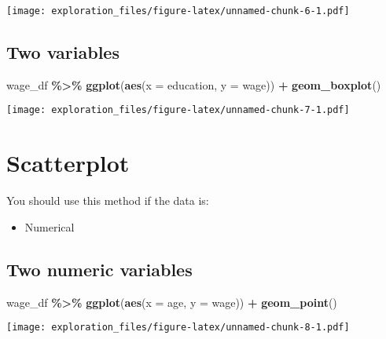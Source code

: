 \documentclass[
]{book}
\newenvironment{Shaded}{\begin{snugshade}}{\end{snugshade}}
\newcommand{\DataTypeTok}[1]{\textcolor[rgb]{0.13,0.29,0.53}{#1}}
\newcommand{\KeywordTok}[1]{\textcolor[rgb]{0.13,0.29,0.53}{\textbf{#1}}}
\newcommand{\NormalTok}[1]{#1}
\newcommand{\OperatorTok}[1]{\textcolor[rgb]{0.81,0.36,0.00}{\textbf{#1}}}
\newcommand{\StringTok}[1]{\textcolor[rgb]{0.31,0.60,0.02}{#1}}
\providecommand{\tightlist}{%
  \setlength{\itemsep}{0pt}\setlength{\parskip}{0pt}}
\begin{document}
\texttt{[image: exploration\_files/figure-latex/unnamed-chunk-6-1.pdf]}

\hypertarget{two-variables-3}{%
\section{Two variables}\label{two-variables-3}}

\begin{Shaded}
\begin{Highlighting}[]
\NormalTok{wage\_df }\OperatorTok{\%\textgreater{}\%}\StringTok{ }
\StringTok{  }\KeywordTok{ggplot}\NormalTok{(}\KeywordTok{aes}\NormalTok{(}\DataTypeTok{x =}\NormalTok{ education, }\DataTypeTok{y =}\NormalTok{ wage)) }\OperatorTok{+}\StringTok{ }
\StringTok{  }\KeywordTok{geom\_boxplot}\NormalTok{()}
\end{Highlighting}
\end{Shaded}

\texttt{[image: exploration\_files/figure-latex/unnamed-chunk-7-1.pdf]}

\hypertarget{scatterplot}{%
\chapter{Scatterplot}\label{scatterplot}}

You should use this method if the data is:

\begin{itemize}
\tightlist
\item
  Numerical
\end{itemize}

\hypertarget{two-numeric-variables}{%
\section{Two numeric variables}\label{two-numeric-variables}}

\begin{Shaded}
\begin{Highlighting}[]
\NormalTok{wage\_df }\OperatorTok{\%\textgreater{}\%}\StringTok{ }
\StringTok{  }\KeywordTok{ggplot}\NormalTok{(}\KeywordTok{aes}\NormalTok{(}\DataTypeTok{x =}\NormalTok{ age, }\DataTypeTok{y =}\NormalTok{ wage)) }\OperatorTok{+}
\StringTok{  }\KeywordTok{geom\_point}\NormalTok{()}
\end{Highlighting}
\end{Shaded}

\texttt{[image: exploration\_files/figure-latex/unnamed-chunk-8-1.pdf]}
\end{document}
